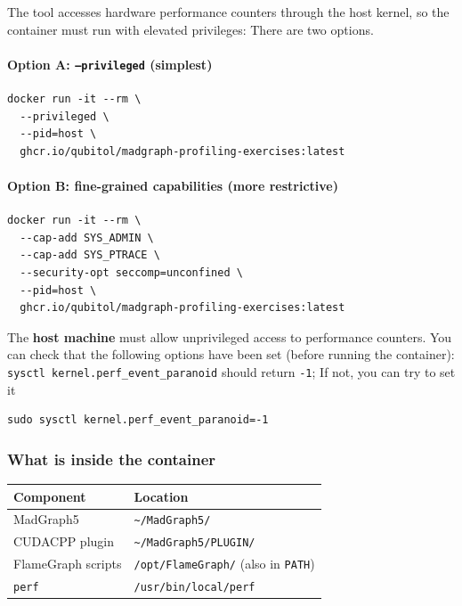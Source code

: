 \documentclass[11pt,a4paper]{article}
\begin{document}
The tool \perf accesses hardware performance counters through the host kernel, so the container must run with elevated privileges:
There are two options.

\paragraph{Option A: \texttt{--privileged} (simplest)}

\begin{lstlisting}
docker run -it --rm \
  --privileged \
  --pid=host \
  ghcr.io/qubitol/madgraph-profiling-exercises:latest
\end{lstlisting}

\paragraph{Option B: fine-grained capabilities (more restrictive)}

\begin{lstlisting}
docker run -it --rm \
  --cap-add SYS_ADMIN \
  --cap-add SYS_PTRACE \
  --security-opt seccomp=unconfined \
  --pid=host \
  ghcr.io/qubitol/madgraph-profiling-exercises:latest
\end{lstlisting}

\begin{warnbox}[Host-side prerequisites]
The \textbf{host machine} must allow unprivileged access to performance counters.
You can check that the following options have been set (before running the container): \texttt{sysctl kernel.perf\_event\_paranoid} should return \texttt{-1};
If not, you can try to set it
\begin{lstlisting}
sudo sysctl kernel.perf_event_paranoid=-1
\end{lstlisting}
\end{warnbox}

\subsubsection{What is inside the container}

\begin{center}
\begin{tabular}{ll}
\toprule
\textbf{Component} & \textbf{Location} \\
\midrule
MadGraph5 & \texttt{\textasciitilde/MadGraph5/} \\
CUDACPP plugin & \texttt{\textasciitilde/MadGraph5/PLUGIN/} \\
FlameGraph scripts & \texttt{/opt/FlameGraph/} (also in \texttt{PATH}) \\
\texttt{perf} & \texttt{/usr/bin/local/perf} \\
\bottomrule
\end{tabular}
\end{center}
\end{document}
